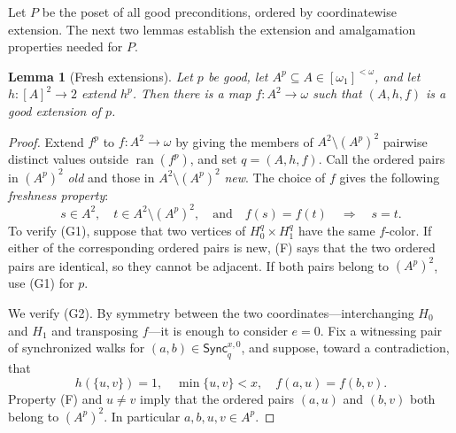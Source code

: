 \documentclass[10pt,a4paper]{amsart}
\numberwithin{equation}{section}
\newtheorem{lemma}[theorem]{Lemma}
\theoremstyle{definition}
\theoremstyle{remark}
\begin{document}
Let $P$ be the poset of all good preconditions, ordered by coordinatewise
extension.  The next two lemmas establish the extension and amalgamation
properties needed for $P$.


\begin{lemma}[Fresh extensions]\label{lem:fresh}
Let $p$ be good, let $A^p\subseteq A\in[\omega_1]^{<\omega}$, and
let $h:[A]^2\to2$ extend $h^p$.  Then there is a map
$f:A^2\to\omega$ such that $(A,h,f)$ is a good extension of $p$.
\end{lemma}

\begin{proof}
Extend $f^p$ to $f:A^2\to\omega$ by giving the members of
$A^2\setminus(A^p)^2$ pairwise distinct values outside
$\operatorname{ran}(f^p)$, and set $q=(A,h,f)$.  Call the ordered
pairs in $(A^p)^2$ \emph{old} and those in
$A^2\setminus(A^p)^2$ \emph{new}.  The choice of $f$ gives the
following \emph{freshness property}:
\begin{displaymath}
 s\in A^2,\quad t\in A^2\setminus(A^p)^2,
 \quad\text{and}\quad f(s)=f(t)
 \quad\Longrightarrow\quad s=t.                       \tag{F}
\end{displaymath}
To verify (G1), suppose that two
vertices of $H_0^q\times H_1^q$ have the same $f$-color.  If either of
the corresponding ordered pairs is new, (F) says
that the two ordered pairs are identical, so they cannot be adjacent.
If both pairs belong to $(A^p)^2$, use (G1) for $p$.

We verify (G2).  By symmetry between the two coordinates---interchanging
$H_0$ and $H_1$ and transposing $f$---it is enough to consider $e=0$.
Fix a witnessing pair of synchronized walks for
$(a,b)\in\mathsf{Sync}^{x,0}_q$, and suppose, toward a contradiction,
that
\begin{equation}\label{eq:fresh-g2-counterexample}
 h(\{u,v\})=1,\quad \min\{u,v\}<x,\quad
 f(a,u)=f(b,v).
\end{equation}
Property (F) and $u\ne v$ imply that the ordered pairs $(a,u)$ and
$(b,v)$ both belong to $(A^p)^2$.  In particular
$a,b,u,v\in A^p$.


\end{proof}
\end{document}
